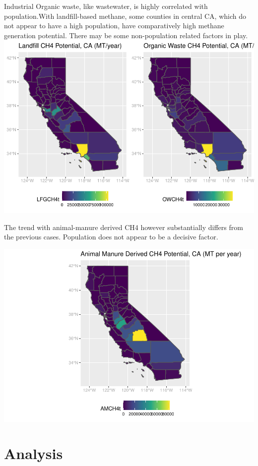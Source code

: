\documentclass[
  12pt,
]{article}
\begin{document}
Industrial Organic waste, like wastewater, is highly correlated with
population.With landfill-based methane, some counties in central CA,
which do not appear to have a high population, have comparatively high
methane generation potential. There may be some non-population related
factors in play.
\includegraphics{FDR_ProjectReport_files/figure-latex/unnamed-chunk-4-1.pdf}

The trend with animal-manure derived CH4 however substantially differs
from the previous cases. Population does not appear to be a decisive
factor.

\includegraphics{FDR_ProjectReport_files/figure-latex/unnamed-chunk-5-1.pdf}

\newpage

\hypertarget{analysis}{%
\section{Analysis}\label{analysis}}
\end{document}
